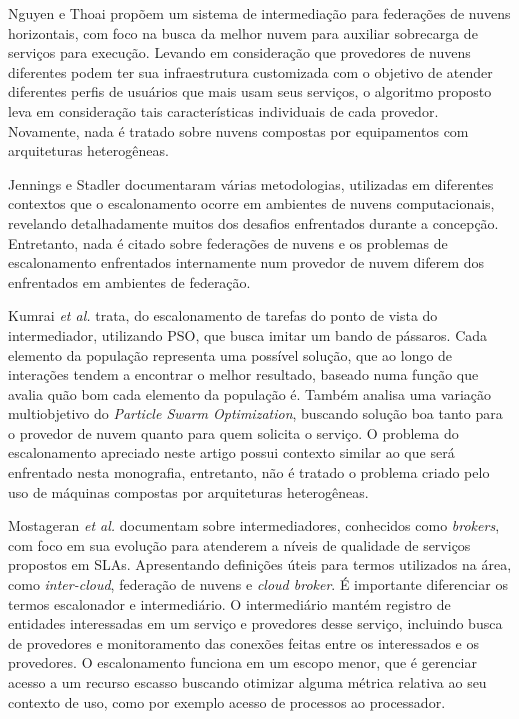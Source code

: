 Nguyen e Thoai \cite{7791859} propõem um sistema de intermediação para federações de nuvens horizontais, com foco na busca da melhor nuvem para auxiliar sobrecarga de serviços para execução. Levando em consideração que provedores de nuvens diferentes podem ter sua infraestrutura customizada com o objetivo de atender diferentes perfis de usuários que mais usam seus serviços, o algoritmo proposto leva em consideração tais características individuais de cada provedor. Novamente, nada é tratado sobre nuvens compostas por equipamentos com arquiteturas heterogêneas.

Jennings e Stadler \cite{Jennings:2015:RMC:2793474.2793493} documentaram  várias metodologias, utilizadas em diferentes contextos que o escalonamento ocorre em ambientes de nuvens computacionais, revelando detalhadamente muitos dos desafios enfrentados durante a concepção. Entretanto, nada é citado sobre federações de nuvens e os problemas de escalonamento enfrentados internamente num provedor de nuvem diferem dos enfrentados em ambientes de federação.

Kumrai \textit{et al.} \cite{7467407} trata, do escalonamento de tarefas do ponto de vista do intermediador, utilizando \acrfull{PSO}, que busca imitar um bando de pássaros. Cada elemento da população representa uma possível solução, que ao longo de interações tendem a encontrar o melhor resultado, baseado numa função que avalia quão bom cada elemento da população é. Também analisa uma variação multiobjetivo do \textit{Particle Swarm Optimization}, buscando solução boa tanto para o provedor de nuvem quanto para quem solicita o serviço. O problema do escalonamento apreciado neste artigo possui contexto similar ao que será enfrentado nesta monografia, entretanto, não é tratado o problema criado pelo uso de máquinas compostas por arquiteturas heterogêneas.

Mostageran \textit{et al.} \cite{7224588} documentam sobre intermediadores, conhecidos como \textit{brokers}, com foco em sua evolução para atenderem a níveis de qualidade de serviços propostos em \acrshort{SLA}s. Apresentando definições úteis para termos utilizados na área, como \textit{inter-cloud}, federação de nuvens e \textit{cloud broker}. É importante diferenciar os termos escalonador e intermediário. O intermediário mantém registro de entidades interessadas em um serviço e provedores desse serviço, incluindo busca de provedores e monitoramento das conexões feitas entre os interessados e os provedores. O escalonamento funciona em um escopo menor, que é gerenciar acesso a um recurso escasso buscando otimizar alguma métrica relativa ao seu contexto de uso, como por exemplo acesso de processos ao processador.


